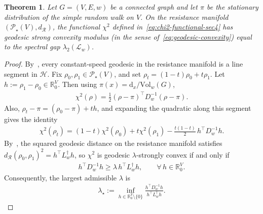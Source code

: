 \documentclass[11pt,a4paper]{article}
\newcommand{\Resis}{\mathcal{R}}
\newcommand{\Prob}{\mathscr{P}}
\newcommand{\Deg}{\mathrm{d}}
\newcommand{\Vol}{\mathrm{Vol}}
\newtheorem{theorem}{Theorem}[section]
\begin{document}
\begin{theorem}\label{thm:modulus-sec4}
    Let $G=(V,E,w)$ be a connected graph and let $\pi$ be the stationary distribution of the simple random walk on $V$. On the resistance manifold $(\Prob_\star(V),d_\Resis)$, the functional $\chi^2$ defined in~\cref{eq:chi2-functional-sec4} has geodesic strong convexity modulus (in the sense of~\cref{eq:geodesic-convexity}) equal to the spectral gap $\lambda_2(\mathcal{L}_w)$.
\end{theorem}

\begin{proof}
    By~, every constant-speed geodesic in the resistance manifold is a line segment in $\mathcal{H}$. Fix $\rho_0,\rho_1\in\Prob_\star(V)$, and set $\rho_t=(1-t)\rho_0+t\rho_1$. Let $h:=\rho_1-\rho_0\in\mathbb{R}^V_0$. Then
    using $\pi(x)=\Deg_x/\Vol_w(G)$,
        \begin{align*}
            \chi^2(\rho) = \frac{1}{2}(\rho-\pi)^\top D_w^{-1}(\rho-\pi).
        \end{align*}
    Also, $\rho_t-\pi=(\rho_0-\pi)+t h$, and expanding the quadratic along this segment gives the identity
        \begin{align*}
            \chi^2(\rho_t)
            = (1-t)\chi^2(\rho_0)+t\chi^2(\rho_1) - \frac{t(1-t)}{2}\, h^\top D_w^{-1} h.
        \end{align*}
    By~, the squared geodesic distance on the resistance manifold satisfies $d_\Resis(\rho_0,\rho_1)^2 = h^\top L_w^\dagger h$, so $\chi^2$ is geodesic $\lambda$-strongly convex if and only if
        \begin{align*}
            h^\top D_w^{-1} h \ge \lambda\, h^\top L_w^\dagger h,\qquad \forall\,h\in\mathbb{R}^V_0.
        \end{align*}
    Consequently, the largest admissible $\lambda$ is
        \begin{align}\label{eq:lambda-as-rayleigh}
            \lambda_\star := \inf_{h\in\mathbb{R}^V_0\setminus\{0\}} \frac{h^\top D_w^{-1} h}{h^\top L_w^\dagger h}.
        \end{align}


\end{proof}
\end{document}
